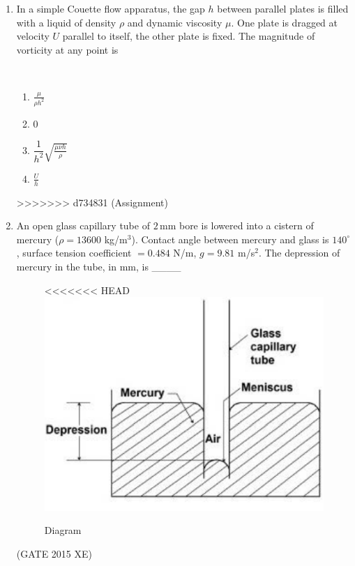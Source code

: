 \documentclass[journal,12pt,onecolumn]{IEEEtran}
\begin{document}
\begin{enumerate}
\begin{enumerate}
\begin{enumerate}[label=\arabic*)]
\vspace{0.5cm}

\item In a simple Couette flow apparatus, the gap $h$ between parallel plates is filled with a liquid of density $\rho$ and dynamic viscosity $\mu$. One plate is dragged at velocity $U$ parallel to itself, the other plate is fixed. The magnitude of vorticity at any point is  

\hfill{} \\
\vspace{0.2cm}
\begin{enumerate}[label=\alph*)]
\item $\frac{\mu}{\rho h^2}$
\vspace{0.1cm}
\item $0$
\item $\dfrac{1}{h^2} \sqrt{\frac{\mu \nu h}{\rho}}$
\vspace{0.1cm}
\item $\frac{U}{h}$
\end{enumerate}
\vspace{0.5cm}
>>>>>>> d734831 (Assignment)

\item An open glass capillary tube of $2\,\mathrm{mm}$ bore is lowered into a cistern of mercury ($\rho=13600$ kg/m$^3$). Contact angle between mercury and glass is $140^\circ$, surface tension coefficient $=0.484$ N/m, $g=9.81$ m/s$^2$. The depression of mercury in the tube, in mm, is \_\_\_\_

\begin{figure}[htbp]
  \centering
<<<<<<< HEAD
  \includegraphics[width=.38\columnwidth]{figs/B/fig2.png} 
  \caption{Diagram}
  \label{fig:figs/B/fig2.png}
\end{figure}

\hfill{(GATE 2015 XE)} \\



\end{enumerate}
\end{enumerate}
\end{enumerate}
\end{document}
